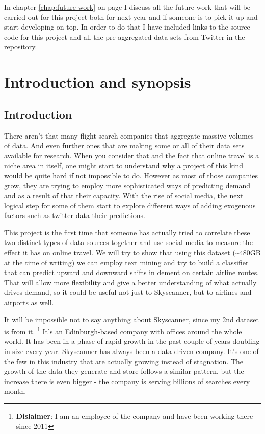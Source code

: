 \documentclass[minf,frontabs,twoside,singlespacing,parskip]{infthesis}
\begin{document}
In chapter \ref{chap:future-work} on page \pageref{chap:future-work} I discuss all the future work that will be carried out for this project both for next year and if someone is to pick it up and start developing on top. In order to do that I have included links to the source code for this project and all the pre-aggregated data sets from Twitter in the repository.



\chapter{Introduction and synopsis}
\label{chap:intro}


\section{Introduction}


There aren't that many flight search companies that aggregate massive volumes of data. And even further ones that are making some or all of their data sets available for research. When you consider that and the fact that online travel is a niche area in itself, one might start to understand why a project of this kind would be quite hard if not impossible to do. However as most of those companies grow, they are trying to employ more sophisticated ways of predicting demand and as a result of that their capacity. With the rise of social media, the next logical step for some of them start to explore different ways of adding exogenous factors such as twitter data their predictions. 


This project is the first time that someone has actually tried to correlate these two distinct types of data sources together and use social media to measure the effect it has on online travel. We will try to show that using this dataset (\textasciitilde 480GB at the time of writing) we can employ text mining and try to build a classifier that can predict upward and downward shifts in dement on certain airline routes. That will allow more flexibility and give a better understanding of what actually drives demand, so it could be useful not just to Skyscanner, but to airlines and airports as well.


It will be impossible not to say anything about Skyscanner, since my 2nd dataset is from it.  \footnote{\textbf{Dislaimer}: I am an employee of the company and have been working there since 2011} It's an Edinburgh-based company with offices around the whole world. It has been in a phase of rapid growth in the past couple of years doubling in size every year.
Skyscanner has always been a data-driven company. It's one of the few in this industry that are actually growing instead of stagnation. The growth of the data they generate and store follows a similar pattern, but the increase there is even bigger - the company is serving billions of searches every month. 
\end{document}
